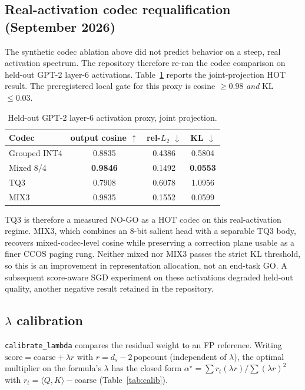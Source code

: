 \documentclass[11pt]{article}
\newcommand{\added}[1]{\textcolor{revisionblue}{#1}}
\newenvironment{addedblock}{\begingroup\color{revisionblue}}{\endgroup}
\theoremstyle{plain}
\theoremstyle{definition}
\newcommand{\ds}{d_s}
\newcommand{\inner}[2]{\langle #1, #2 \rangle}
\newcommand{\popc}{\mathrm{popcount}}
\begin{document}
\subsection{Real-activation codec requalification (September 2026)}
\label{sec:codec-real}
\begin{addedblock}
The synthetic codec ablation above did not predict behavior on a steep,
real activation spectrum. The repository therefore re-ran the codec comparison
on held-out GPT-2 layer-6 activations. Table~\ref{tab:codec-real} reports the
joint-projection HOT result. The preregistered local gate for this proxy is
cosine $\ge 0.98$ \emph{and} KL $\le 0.03$.

\begin{table}[t]
\centering
\caption{\added{Held-out GPT-2 layer-6 activation proxy, joint projection.}}
\label{tab:codec-real}
\small
\begin{tabular}{@{}lccc@{}}
\toprule
Codec & output cosine $\uparrow$ & rel-$L_2$ $\downarrow$ & KL $\downarrow$ \\
\midrule
Grouped INT4 & 0.8835 & 0.4386 & 0.5804 \\
Mixed 8/4 & \textbf{0.9846} & 0.1492 & \textbf{0.0553} \\
TQ3 & 0.7908 & 0.6078 & 1.0956 \\
MIX3 & 0.9835 & 0.1552 & 0.0599 \\
\bottomrule
\end{tabular}
\end{table}

TQ3 is therefore a measured NO-GO as a HOT codec on this real-activation
regime. MIX3, which combines an 8-bit salient head with a separable TQ3 body,
recovers mixed-codec-level cosine while preserving a correction plane usable as
a finer CCOS paging rung. Neither mixed nor MIX3 passes the strict KL threshold,
so this is an improvement in representation allocation, not an end-task GO.
A subsequent score-aware SGD experiment on these activations degraded held-out
quality, another negative result retained in the repository.
\end{addedblock}

\subsection{$\lambda$ calibration}
\label{sec:calib}
\texttt{calibrate\_lambda} compares the residual weight to an FP
reference. Writing $\text{score} = \text{coarse} + \lambda r$ with
$r = \ds - 2\,\popc$ (independent of $\lambda$), the optimal multiplier
on the formula's $\lambda$ has the closed form
$\alpha^\star = \sum r_t (\lambda r) / \sum (\lambda r)^2$ with
$r_t = \inner{Q}{K} - \text{coarse}$ (Table~\ref{tab:calib}).
\end{document}
